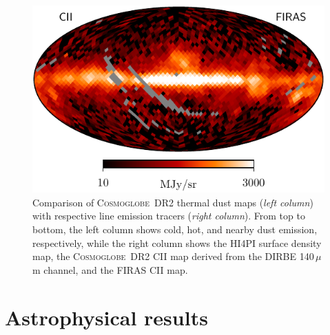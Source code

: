 \documentclass{aa}
\def\Cosmoglobe{\textsc{Cosmoglobe}}
\begin{document}
\begin{figure}
  \includegraphics[width=0.49\linewidth]{figures/init_CII_firas_n16_v20.pdf}
  \caption{Comparison of \Cosmoglobe\ DR2 thermal dust maps (\emph{left column}) with respective line emission tracers (\emph{right column}). From top to bottom, the left column shows cold, hot, and nearby dust emission, respectively, while the right column shows the HI4PI surface density map, the \Cosmoglobe\ DR2 CII map derived from the DIRBE 140\,$\mu$m channel, and the FIRAS CII map.  }
  \label{fig:dustmaps}
\end{figure}




\clearpage
\section{Astrophysical results}
\end{document}
